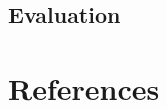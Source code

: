\documentclass[a4paper,12pt]{article}
\begin{document}
\subsection{Evaluation}
\section{References}



\end{document}
